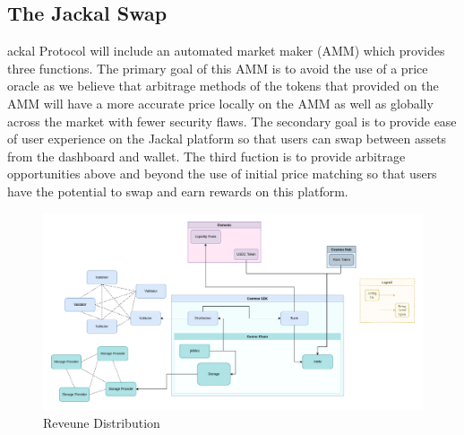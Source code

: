 \documentclass[11pt, nofootinbib]{article}
\begin{document}
\subsection{The Jackal Swap}
ackal Protocol will include an automated market maker (AMM) which provides three functions.  The primary goal of this AMM
is to avoid the use of a price oracle as we believe that arbitrage methods of the tokens that 
provided on the AMM will have a more accurate price locally on the AMM as well as globally 
across the market with fewer security flaws.  The secondary goal is to provide ease
of user experience on the Jackal platform so that users can swap between assets from the dashboard and wallet. 
The third fuction is to provide arbitrage opportunities above and beyond the use of initial price matching 
so that users have the potential to swap and earn rewards on this platform.  

\newpage
\begin{center}
\begin{figure}
\centering
\hspace*{-2.5cm}
\includegraphics[width=1.3\textwidth]{chart3.png}
\caption{Reveune Distribution}
\end{figure}
\end{center}
\end{document}
